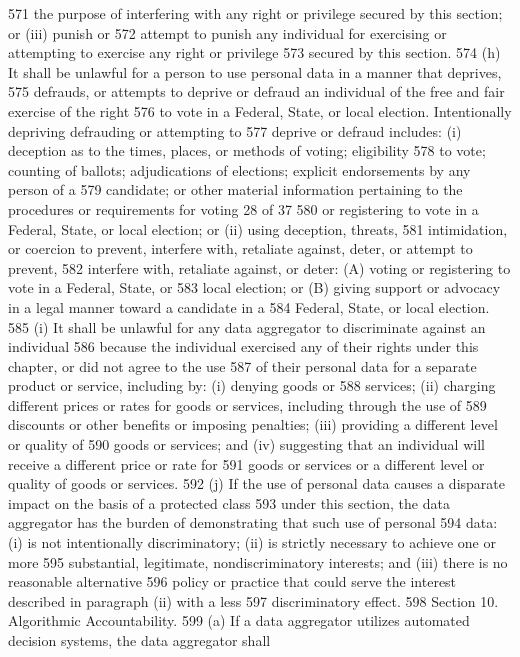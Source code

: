 571 the purpose of interfering with any right or privilege secured by this section; or (iii) punish or
572 attempt to punish any individual for exercising or attempting to exercise any right or privilege
573 secured by this section.
574 (h) It shall be unlawful for a person to use personal data in a manner that deprives,
575 defrauds, or attempts to deprive or defraud an individual of the free and fair exercise of the right
576 to vote in a Federal, State, or local election. Intentionally depriving defrauding or attempting to
577 deprive or defraud includes: (i) deception as to the times, places, or methods of voting; eligibility
578 to vote; counting of ballots; adjudications of elections; explicit endorsements by any person of a
579 candidate; or other material information pertaining to the procedures or requirements for voting
28 of 37
580 or registering to vote in a Federal, State, or local election; or (ii) using deception, threats,
581 intimidation, or coercion to prevent, interfere with, retaliate against, deter, or attempt to prevent,
582 interfere with, retaliate against, or deter: (A) voting or registering to vote in a Federal, State, or
583 local election; or (B) giving support or advocacy in a legal manner toward a candidate in a
584 Federal, State, or local election.
585 (i) It shall be unlawful for any data aggregator to discriminate against an individual
586 because the individual exercised any of their rights under this chapter, or did not agree to the use
587 of their personal data for a separate product or service, including by: (i) denying goods or
588 services; (ii) charging different prices or rates for goods or services, including through the use of
589 discounts or other benefits or imposing penalties; (iii) providing a different level or quality of
590 goods or services; and (iv) suggesting that an individual will receive a different price or rate for
591 goods or services or a different level or quality of goods or services.
592 (j) If the use of personal data causes a disparate impact on the basis of a protected class
593 under this section, the data aggregator has the burden of demonstrating that such use of personal
594 data: (i) is not intentionally discriminatory; (ii) is strictly necessary to achieve one or more
595 substantial, legitimate, nondiscriminatory interests; and (iii) there is no reasonable alternative
596 policy or practice that could serve the interest described in paragraph (ii) with a less
597 discriminatory effect.
598 Section 10. Algorithmic Accountability.
599 (a) If a data aggregator utilizes automated decision systems, the data aggregator shall
